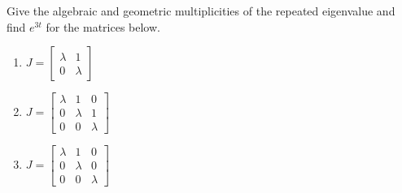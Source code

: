 \item Give the algebraic and geometric multiplicities of the repeated eigenvalue and find $e^{3t}$ for the matrices
  below.
  \begin{enumerate}
  \item $J = \begin{bmatrix}
      \lambda & 1 \\
      0 & \lambda
    \end{bmatrix}$
  \item $J = \begin{bmatrix}
      \lambda & 1 & 0\\
      0 & \lambda & 1\\
      0 & 0 & \lambda
    \end{bmatrix}$
  \item $J = \begin{bmatrix}
      \lambda & 1 & 0\\
      0 & \lambda & 0\\
      0 & 0 & \lambda
    \end{bmatrix}$
  \end{enumerate}